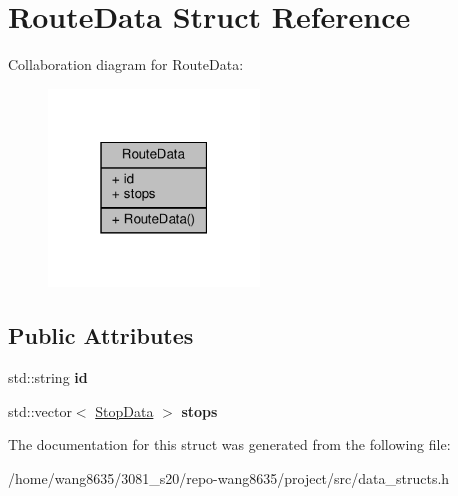 \hypertarget{structRouteData}{}\section{Route\+Data Struct Reference}
\label{structRouteData}


Collaboration diagram for Route\+Data\+:\nopagebreak
\begin{figure}[H]
\begin{center}
\leavevmode
\includegraphics[width=159pt]{structRouteData__coll__graph}
\end{center}
\end{figure}
\subsection*{Public Attributes}
\begin{DoxyCompactItemize}
\item 
\mbox{\label{structRouteData_a578af871a15d4737ab8d2074887da85f}} 
std\+::string {\bfseries id}
\item 
\mbox{\label{structRouteData_af867789789fbcfe97bdd554e56b121bf}} 
std\+::vector$<$ \hyperlink{structStopData}{Stop\+Data} $>$ {\bfseries stops}
\end{DoxyCompactItemize}


The documentation for this struct was generated from the following file\+:\begin{DoxyCompactItemize}
\item 
/home/wang8635/3081\+\_\+s20/repo-\/wang8635/project/src/data\+\_\+structs.\+h\end{DoxyCompactItemize}
